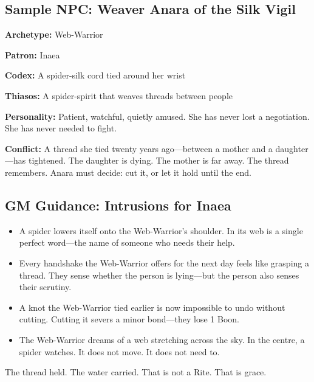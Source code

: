 \subsection{Sample NPC: Weaver Anara of the Silk Vigil}

\textbf{Archetype:} Web-Warrior

\textbf{Patron:} Inaea

\textbf{Codex:} A spider-silk cord tied around her wrist

\textbf{Thiasos:} A spider-spirit that weaves threads between people

\textbf{Personality:} Patient, watchful, quietly amused. She has never lost a negotiation. She has never needed to fight.

\textbf{Conflict:} A thread she tied twenty years ago—between a mother and a daughter—has tightened. The daughter is dying. The mother is far away. The thread remembers. Anara must decide: cut it, or let it hold until the end.

\subsection{GM Guidance: Intrusions for Inaea}

\begin{itemize}
\item A spider lowers itself onto the Web-Warrior's shoulder. In its web is a single perfect word—the name of someone who needs their help.
\item Every handshake the Web-Warrior offers for the next day feels like grasping a thread. They sense whether the person is lying—but the person also senses their scrutiny.
\item A knot the Web-Warrior tied earlier is now impossible to undo without cutting. Cutting it severs a minor bond—they lose 1 Boon.
\item The Web-Warrior dreams of a web stretching across the sky. In the centre, a spider watches. It does not move. It does not need to.
\end{itemize}

The thread held. The water carried. That is not a Rite. That is grace.
